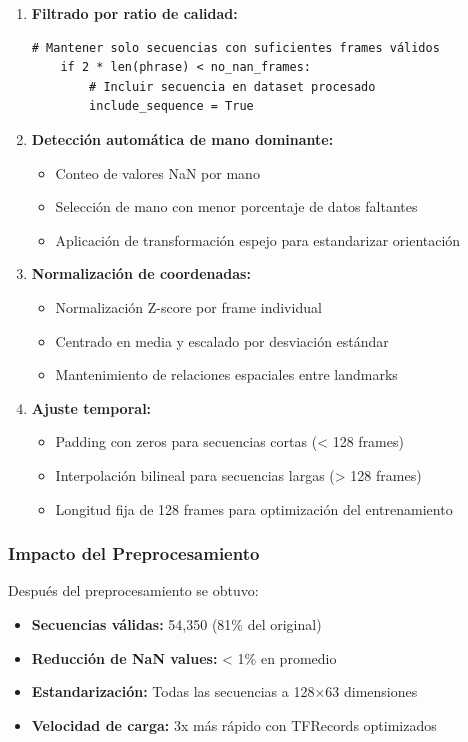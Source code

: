 \documentclass[12pt,a4paper]{article}
\begin{document}
\begin{enumerate}
    \item \textbf{Filtrado por ratio de calidad:}
    \begin{lstlisting}[style=python, caption=Filtro de calidad por ratio frames/caracteres]
    # Mantener solo secuencias con suficientes frames válidos
    if 2 * len(phrase) < no_nan_frames:
        # Incluir secuencia en dataset procesado
        include_sequence = True
    \end{lstlisting}
    
    \item \textbf{Detección automática de mano dominante:}
    \begin{itemize}
        \item Conteo de valores NaN por mano
        \item Selección de mano con menor porcentaje de datos faltantes
        \item Aplicación de transformación espejo para estandarizar orientación
    \end{itemize}
    
    \item \textbf{Normalización de coordenadas:}
    \begin{itemize}
        \item Normalización Z-score por frame individual
        \item Centrado en media y escalado por desviación estándar
        \item Mantenimiento de relaciones espaciales entre landmarks
    \end{itemize}
    
    \item \textbf{Ajuste temporal:}
    \begin{itemize}
        \item Padding con zeros para secuencias cortas (< 128 frames)
        \item Interpolación bilineal para secuencias largas (> 128 frames)
        \item Longitud fija de 128 frames para optimización del entrenamiento
    \end{itemize}
\end{enumerate}

\subsubsection{Impacto del Preprocesamiento}
Después del preprocesamiento se obtuvo:
\begin{itemize}
    \item \textbf{Secuencias válidas:} 54,350 (81\% del original)
    \item \textbf{Reducción de NaN values:} < 1\% en promedio
    \item \textbf{Estandarización:} Todas las secuencias a 128×63 dimensiones
    \item \textbf{Velocidad de carga:} 3x más rápido con TFRecords optimizados
\end{itemize}
\end{document}

